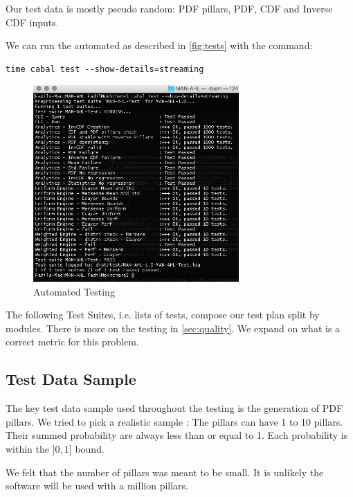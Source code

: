 \documentclass[12pt,a4paper,article]{memoir} %
\begin{document}
Our test data is mostly pseudo random: 
PDF pillars, PDF, CDF and Inverse CDF inputs.

We can run the automated as described in  \autoref{fig:tests} with the command:
\begin{verbatim}
time cabal test --show-details=streaming
\end{verbatim}
\begin{figure}[h!]
\begin{center}
\includegraphics[width=0.7\textwidth]{img/tests.png}
\caption{Automated Testing}
\label{fig:tests}
\end{center}
\end{figure}

The following Test Suites, i.e. lists of tests, compose our test plan split by modules.
There is more on the testing in \autoref{sec:quality}. We expand on what is a correct 
metric for this problem.

\subsection{Test Data Sample}

The key test data sample used throughout the testing 
is the generation of PDF pillars.
We tried to pick a realistic sample :
The pillars can have 1 to 10 pillars. Their summed probability are always less 
than or equal to 1.  Each probability is within the $]0, 1]$ bound.

We felt that the number of pillars was meant to be small. It is unlikely
the software will be used with a million pillars. 
\end{document}
